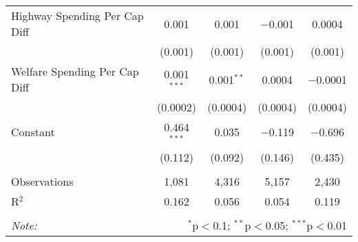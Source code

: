 \begin{table}[!htbp]
\begin{tabular}{@{\extracolsep{5pt}}lcccc}
  Highway Spending Per Cap Diff & 0.001 & 0.001 & $-$0.001 & 0.0004 \\ 
  & (0.001) & (0.001) & (0.001) & (0.001) \\ 
  Welfare Spending Per Cap Diff & 0.001$^{***}$ & 0.001$^{**}$ & 0.0004 & $-$0.0001 \\ 
  & (0.0002) & (0.0004) & (0.0004) & (0.0004) \\ 
  Constant & 0.464$^{***}$ & 0.035 & $-$0.119 & $-$0.696 \\ 
  & (0.112) & (0.092) & (0.146) & (0.435) \\ 
 \hline \\[-1.8ex] 
Observations & 1,081 & 4,316 & 5,157 & 2,430 \\ 
R$^{2}$ & 0.162 & 0.056 & 0.054 & 0.119 \\ 
\hline 
\hline \\[-1.8ex] 
\textit{Note:}  & \multicolumn{4}{r}{$^{*}$p$<$0.1; $^{**}$p$<$0.05; $^{***}$p$<$0.01} \\ 
\end{tabular} 
\end{table} 
